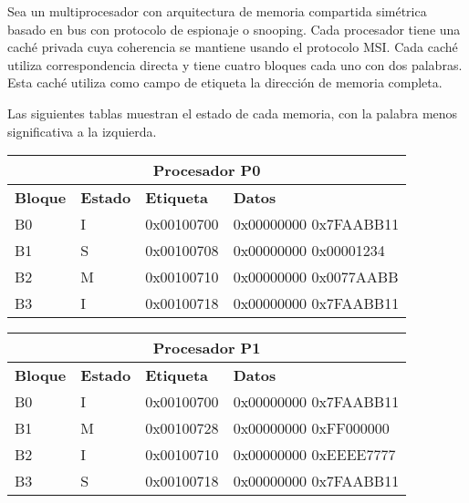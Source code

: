 \begin{acexercise}\end{acexercise}
\label{ex:m5-01:msi-01}

Sea un multiprocesador con arquitectura de memoria compartida simétrica basado
en bus con protocolo de espionaje o snooping. Cada procesador tiene una caché
privada cuya coherencia se mantiene usando el protocolo MSI. Cada caché utiliza
correspondencia directa y tiene cuatro bloques cada uno con dos palabras. Esta
caché utiliza como campo de etiqueta la dirección de memoria completa.

Las siguientes tablas muestran el estado de cada memoria, con la palabra menos
significativa a la izquierda.

\medskip

\begin{tabular}{|l|l|l|l|}
\hline
\multicolumn{4}{|c|}{Procesador P0}\\
\hline
\textbf{Bloque} &
\textbf{Estado} &
\textbf{Etiqueta} &
\textbf{Datos}
\\
\hline
\hline

B0 & I & 0x00100700 & 0x00000000 0x7FAABB11\\
\hline

B1 & S & 0x00100708 & 0x00000000 0x00001234\\
\hline

B2 & M & 0x00100710 & 0x00000000 0x0077AABB\\
\hline

B3 & I & 0x00100718 & 0x00000000 0x7FAABB11\\
\hline
\end{tabular}

\medskip

\begin{tabular}{|l|l|l|l|}
\hline
\multicolumn{4}{|c|}{Procesador P1}\\
\hline
\textbf{Bloque} &
\textbf{Estado} &
\textbf{Etiqueta} &
\textbf{Datos}
\\
\hline
\hline

B0 & I & 0x00100700 & 0x00000000 0x7FAABB11\\
\hline
B1 & M & 0x00100728 & 0x00000000 0xFF000000\\
\hline
B2 & I & 0x00100710 & 0x00000000 0xEEEE7777\\
\hline
B3 & S & 0x00100718 & 0x00000000 0x7FAABB11\\
\hline
\end{tabular}

\medskip

